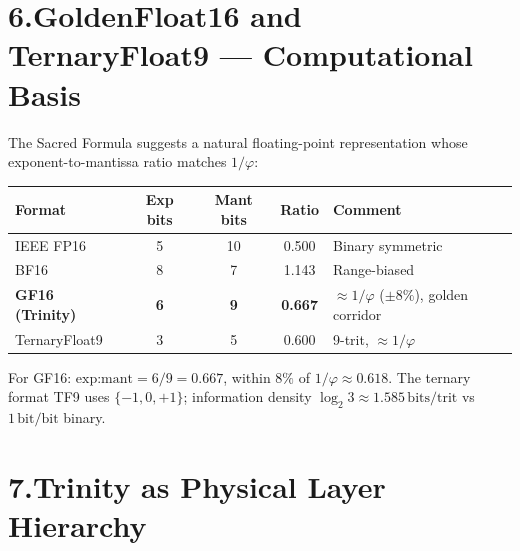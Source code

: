 \documentclass[12pt,a4paper]{article}
\newcommand{\ph}{\varphi}
\begin{document}
\section*{6.\quad GoldenFloat16 and TernaryFloat9 --- Computational Basis}

The Sacred Formula suggests a natural floating-point representation
whose exponent-to-mantissa ratio matches $1/\ph$:

\begin{center}\small
\begin{tabular}{lcccl}
\toprule
\textbf{Format} & \textbf{Exp bits} & \textbf{Mant bits}
  & \textbf{Ratio} & \textbf{Comment} \\
\midrule
IEEE FP16      & 5 & 10 & 0.500 & Binary symmetric \\
BF16           & 8 & 7  & 1.143 & Range-biased \\
\textbf{GF16 (Trinity)} & \textbf{6} & \textbf{9}
  & \textbf{0.667} & $\approx 1/\ph$ ($\pm8\%$), golden corridor \\
TernaryFloat9  & 3 & 5  & 0.600 & 9-trit, $\approx 1/\ph$ \\
\bottomrule
\end{tabular}
\end{center}

For GF16: $\text{exp:mant} = 6/9 = 0.667$, within $8\%$ of $1/\ph\approx0.618$.
The ternary format TF9 uses $\{-1,0,+1\}$; information density
$\log_2 3 \approx 1.585\,\text{bits/trit}$ vs $1\,\text{bit/bit}$ binary.

\section*{7.\quad Trinity as Physical Layer Hierarchy}
\end{document}
